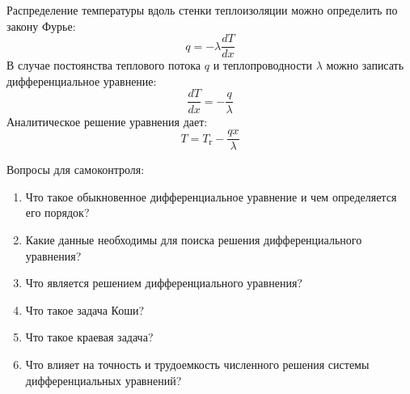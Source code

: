 
Распределение температуры вдоль стенки теплоизоляции можно определить по закону Фурье:
\begin{equation}
	q=-\lambda \dfrac{d T}{d x}
\end{equation} 
В случае постоянства теплового потока $q$ и теплопроводности $\lambda$ можно записать дифференциальное уравнение:
\begin{equation}
	\dfrac{d T}{d x} =- \dfrac{q}{\lambda}
\end{equation}
Аналитическое решение уравнения дает:
\begin{equation}
	 T = T_г - \dfrac{q x}{\lambda}
\end{equation}

Вопросы для самоконтроля:
\begin{enumerate}
	\item Что такое обыкновенное дифференциальное уравнение и чем определяется его порядок?
	\item Какие данные необходимы для поиска решения дифференциального уравнения?
	\item Что является решением дифференциального уравнения?
	\item Что такое задача Коши?
	\item Что такое краевая задача?
	\item Что влияет на точность и трудоемкость численного решения системы дифференциальных уравнений?
\end{enumerate}
